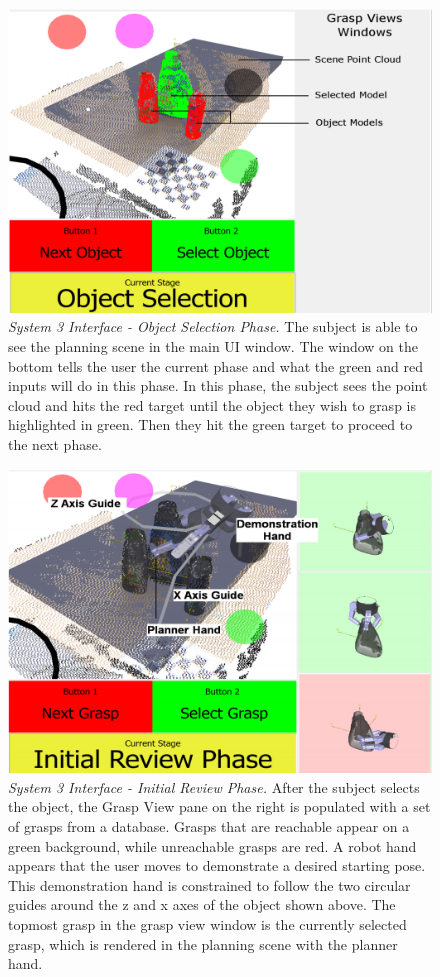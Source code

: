 \begin{figure}
\centering
\includegraphics[width=.99\columnwidth]{ui_3_a.png}
\caption{\emph{System 3 Interface - Object Selection Phase.} The subject is able to see the planning scene in the main UI window. The window on the bottom tells the user the current phase and what the green and red inputs will do in this phase. In this phase, the subject sees the point cloud and hits the red target until the object they wish to grasp is highlighted in green. Then they hit the green target to proceed to the next phase.}
\label{fig:semg_ui_a}
\end{figure}

\begin{figure}
\centering
\includegraphics[width=.99\columnwidth]{ui_3_b.png}
\caption{\emph{System 3 Interface - Initial Review Phase.} After the subject selects the object, the Grasp View pane on the right is populated with a set of grasps from a database. Grasps that are reachable appear on a green background, while unreachable grasps are red. A robot hand appears that the user moves to demonstrate a desired starting pose. This demonstration hand is constrained to follow the two circular guides around the z and x axes of the object shown above. The topmost grasp in the grasp view window is the currently selected grasp, which is rendered in the planning scene with the planner hand.}
\label{fig:semg_ui_b}
\end{figure}

